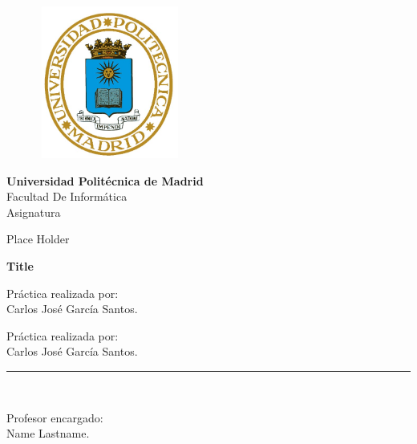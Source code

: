 


\begin{titlepage}

\begin{center}

\begin{figure}[htb]
\begin{center}
\vspace*{-3cm}
\includegraphics[width=4.7cm, height=5cm]{logo}\\
\vspace*{1cm}
\end{center}
\end{figure}


\textbf{\LARGE{Universidad Politécnica de Madrid}}\\
\vspace*{0.5cm}
 \LARGE {Facultad De Informática}\\
\vspace*{1.25cm}
\large{Asignatura} \\
\vspace*{1.5cm}
\begin{large}
Place Holder\\
\end{large}
\vspace*{0.2in}
\begin{large}
\textbf{Title}\\
\end{large}
\vspace*{1in}
\begin{large}
 Práctica realizada por:\\
 \vspace*{0.25cm}
 Carlos José García Santos.\\

\end{large}
\vspace*{7cm}
 Práctica realizada por:\\
 \vspace*{0.25cm}
 Carlos José García Santos.\\

\rule{80mm}{0.1mm}\\
\vspace*{0.1in}
\begin{large}
Profesor encargado: \\
Name Lastname.
\end{large}
\end{center}

\end{titlepage}

